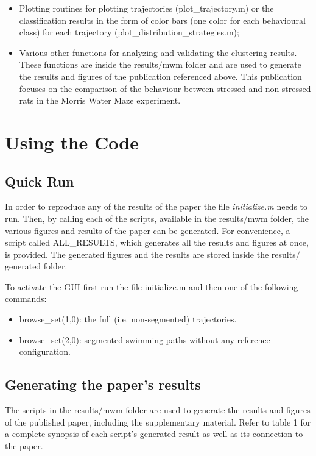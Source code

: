 \documentclass[12pt,titlepage]{article}
\begin{document}
\begin{doublespace}
\begin{itemize}
	\item Plotting routines for plotting trajectories (plot\_trajectory.m) or the classification results in the form of color bars (one color for each behavioural class) for each trajectory (plot\_distribution\_strategies.m);
	
	\item Various other functions for analyzing and validating the clustering results. These functions are inside the results$/$mwm folder and are used to generate the results and figures of the publication referenced above. This publication focuses on the comparison of the behaviour between stressed and non-stressed rats in the Morris Water Maze experiment.
\end{itemize}


\section{Using the Code}
\subsection{Quick Run}

In order to reproduce any of the results of the paper the file \textit{initialize.m} needs to run. Then, by calling each of the scripts, available in the results$/$mwm folder, the various figures and results of the paper can be generated. For convenience, a script called ALL\_RESULTS, which generates all the results and figures at once, is provided. The generated figures and the results are stored inside the results$/$generated folder.

To activate the GUI first run the file initialize.m and then one of the following commands:
\begin{itemize}
	\item browse\_set(1,0): the full (i.e. non-segmented) trajectories.
	\item browse\_set(2,0): segmented swimming paths without any reference configuration.
\end{itemize}

\subsection{Generating the paper’s results}

The scripts in the results$/$mwm folder are used to generate the results and figures of the published paper, including the supplementary material. Refer to table 1 for a complete synopsis of each script's generated result as well as its connection to the paper.


\end{doublespace}
\end{document}
